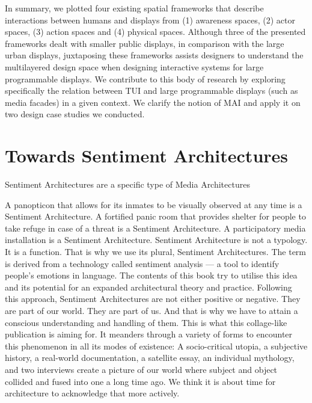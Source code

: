In summary, we plotted four existing spatial frameworks that describe interactions between humans and displays from (1) awareness spaces, (2) actor spaces, (3) action spaces and (4) physical spaces. 
Although three of the presented frameworks dealt with smaller public displays, in comparison with the large urban displays, juxtaposing these frameworks assists designers to understand the multilayered design space when designing interactive systems for large programmable displays. 
We contribute to this body of research by exploring specifically the relation between TUI and large programmable displays (such as media facades) in a given context. We clarify the notion of MAI and apply it on two design case studies we conducted.




\section {Towards Sentiment Architectures}

Sentiment Architectures are a specific type of Media Architectures


A panopticon that allows for its inmates to be visually observed at any time is a Sentiment Architecture. 
A fortified panic room that provides shelter for people to take refuge in case of a threat is a Sentiment Architecture. 
A participatory media installation is a Sentiment Architecture. 
Sentiment Architecture is not a typology.
It is a function. That is why we use its plural, Sentiment Architectures.
The term is derived from a technology called sentiment analysis — a tool to identify people’s emotions in language. 
The contents of this book try to utilise this idea and its potential for an expanded architectural theory and practice. 
Following this approach, Sentiment Architectures are not either positive or negative. 
They are part of our world. They are part of us. 
And that is why we have to attain a conscious understanding and handling of them. 
This is what this collage-like publication is aiming for.
It meanders through a variety of forms to encounter this phenomenon in all its modes of existence: A socio-critical utopia, a subjective history, a real-world documentation, a satellite essay, an individual mythology, and two interviews create a picture of our world where subject and object collided and fused into one a long time ago. 
We think it is about time for architecture to acknowledge that more actively.

